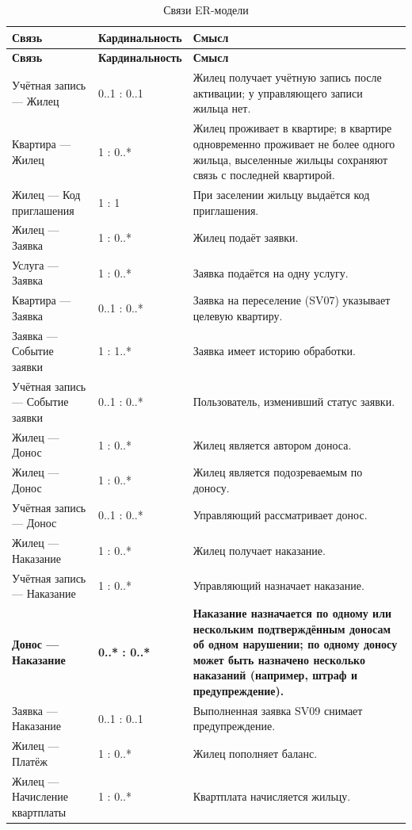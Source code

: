 \documentclass[12pt,a4paper]{article}
\begin{document}
\begin{longtable}{L{45.1mm} L{32.3mm} L{79.4mm}}
\caption{Связи ER-модели}\label{tab:relations}\\
\toprule \textbf{Связь} & \textbf{Кардинальность} & \textbf{Смысл} \\ \midrule
\endfirsthead
\toprule \textbf{Связь} & \textbf{Кардинальность} & \textbf{Смысл} \\ \midrule
\endhead
\bottomrule
\endfoot
Учётная запись — Жилец & 0..1 : 0..1 & Жилец получает учётную запись после активации; у управляющего записи жильца нет. \\
Квартира — Жилец & 1 : 0..* & Жилец проживает в квартире; в квартире одновременно проживает не более одного жильца, выселенные жильцы сохраняют связь с последней квартирой. \\
Жилец — Код приглашения & 1 : 1 & При заселении жильцу выдаётся код приглашения. \\
Жилец — Заявка & 1 : 0..* & Жилец подаёт заявки. \\
Услуга — Заявка & 1 : 0..* & Заявка подаётся на одну услугу. \\
Квартира — Заявка & 0..1 : 0..* & Заявка на переселение (SV07) указывает целевую квартиру. \\
Заявка — Событие заявки & 1 : 1..* & Заявка имеет историю обработки. \\
Учётная запись — Событие заявки & 0..1 : 0..* & Пользователь, изменивший статус заявки. \\
Жилец — Донос & 1 : 0..* & Жилец является автором доноса. \\
Жилец — Донос & 1 : 0..* & Жилец является подозреваемым по доносу. \\
Учётная запись — Донос & 0..1 : 0..* & Управляющий рассматривает донос. \\
Жилец — Наказание & 1 : 0..* & Жилец получает наказание. \\
Учётная запись — Наказание & 1 : 0..* & Управляющий назначает наказание. \\
\textbf{Донос — Наказание} & \textbf{0..* : 0..*} & \textbf{Наказание назначается по одному или нескольким подтверждённым доносам об одном нарушении; по одному доносу может быть назначено несколько наказаний (например, штраф и предупреждение).} \\
Заявка — Наказание & 0..1 : 0..1 & Выполненная заявка SV09 снимает предупреждение. \\
Жилец — Платёж & 1 : 0..* & Жилец пополняет баланс. \\
Жилец — Начисление квартплаты & 1 : 0..* & Квартплата начисляется жильцу. \\

\end{longtable}
\end{document}
